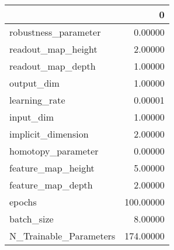 \begin{tabular}{lr}
\toprule
{} &          0 \\
\midrule
robustness\_parameter   &    0.00000 \\
readout\_map\_height     &    2.00000 \\
readout\_map\_depth      &    1.00000 \\
output\_dim             &    1.00000 \\
learning\_rate          &    0.00001 \\
input\_dim              &    1.00000 \\
implicit\_dimension     &    2.00000 \\
homotopy\_parameter     &    0.00000 \\
feature\_map\_height     &    5.00000 \\
feature\_map\_depth      &    2.00000 \\
epochs                 &  100.00000 \\
batch\_size             &    8.00000 \\
N\_Trainable\_Parameters &  174.00000 \\
\bottomrule
\end{tabular}
